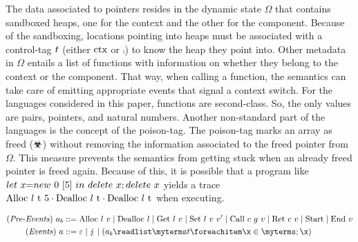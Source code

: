 \documentclass[utf8,acmsmall,review,screen,dvipsnames,anonymous]{acmart}
\begin{document}
The data associated to pointers resides in the dynamic state $\Omega$ that contains sandboxed heaps, one for the context and the other for the component.
Because of the sandboxing, locations pointing into heaps must be associated with a control-tag $t$ (either $\text{ctx}$ or $\comp$) to know the heap they point into.
Other metadata in $\Omega$ entails a list of functions with information on whether they belong to the context or the component.
That way, when calling a function, the semantics can take care of emitting appropriate events that signal a context switch.
For the languages considered in this paper, functions are second-class.
So, the only values are pairs, pointers, and natural numbers.
Another non-standard part of the languages is the concept of the poison-tag.
The poison-tag marks an array as freed ($\poisoned$) without removing the information associated to the freed pointer from $\Omega$.
This measure prevents the semantics from getting stuck when an already freed pointer is freed again.
Because of this, it is possible that a program like ${let}\ x {{=}} {new}\ 0\ {{[}}5{{]}}\ {in}\ {delete}\ x;{delete}\ x$ yields a trace $\ev{Alloc\ \loc\ \sandboxtag\ 5}\cdot\ev{Dealloc\ \loc\ \sandboxtag}\cdot\ev{Dealloc\ \loc\ \sandboxtag}$ when executing.

\begin{gather*}
  \begin{aligned}
  \mi{(Pre\text{-}Events)}~\event[_{b}]&\bnfdef \ev{Alloc}\ \loc\ \valueexpr \mid \ev{Dealloc}\ \loc \mid \ev{Get}\ \loc\ \valueexpr \mid \ev{Set}\ \loc\ \valueexpr\ \valueexpr['] \mid \ev{Call}\ \comm\ g\ \valueexpr \mid \ev{Ret}\ \comm\ \valueexpr \mid \ev{Start} \mid \ev{End}\ \valueexpr \\
  \mi{(Events)}~\event&\bnfdef \emptyevent \mid \lightning \mid \tup{\event[_{b}]}{\sandboxtag} \\
  \end{aligned}
\end{gather*}
\end{document}
